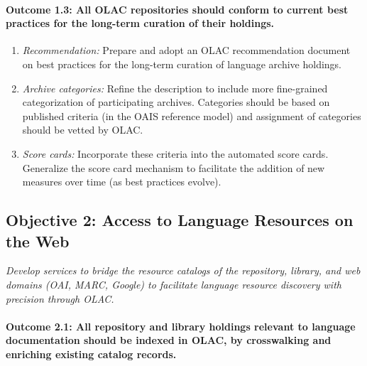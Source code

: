 \def\task{1.3}
\paragraph{Outcome {\task}: All OLAC repositories should conform to current best practices
      for the long-term curation of their holdings.}

\begin{enumerate}[label=\emph{\task\alph*}]\setlength{\itemsep}{0pt}
\item \emph{Recommendation:}
  Prepare and adopt an OLAC recommendation document on 
  best practices for the long-term curation of language archive holdings.
\item \emph{Archive categories:}
  Refine the {\tt <olac-archive>} description to include
  more fine-grained categorization of participating archives.
  Categories should be based on published criteria (in the OAIS reference model)
  and assignment of categories should be vetted by OLAC.
\item \emph{Score cards:}
  Incorporate these criteria into the automated score cards.
  Generalize the score card mechanism to facilitate the addition
  of new measures over time (as best practices evolve).
\end{enumerate}

\subsection*{Objective 2: Access to Language Resources on the Web}

\emph{Develop services to bridge the resource catalogs of the
  repository, library, and web domains (OAI, MARC, Google)
  to facilitate language resource discovery with precision through OLAC.}

\def\task{2.1}
\paragraph{Outcome {\task}:  All repository and library holdings relevant to language
   documentation should be indexed in OLAC, by
   crosswalking and enriching existing catalog records.}

